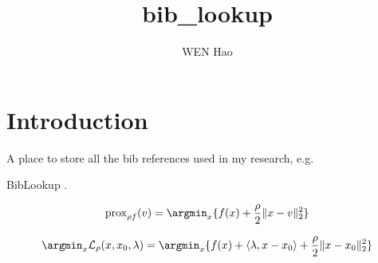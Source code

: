 \documentclass{article}
\title{bib\_lookup}
\author{WEN Hao}
\date{}
\begin{document}
\maketitle

\section{Introduction}

A place to store all the bib references used in my research, e.g. \cite{Wen_cpsc2021,torch_ecg_paper,Kang_2022_cinc2021_iop,wen_cinc2021,Pang_2021_SpineParseNet,kiyasseh2021clocs}

BibLookup \cite{bib_lookup}.

$$\operatorname{prox}_{\rho f}(v) = \argmin_x \{f(x) + \dfrac{\rho}{2} \lVert x-v \rVert_2^2\}$$

$$\argmin_x \mathcal{L}_{\rho}(x, x_0, \lambda) = \argmin_x \{f(x) + \langle \lambda, x-x_0 \rangle + \dfrac{\rho}{2} \lVert x-x_0 \rVert_2^2\}$$


\printbibliography[heading=bibliography]
\end{document}
